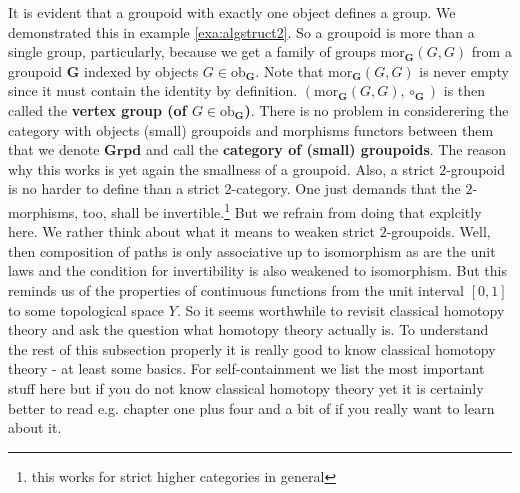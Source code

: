 It is evident that a groupoid with exactly one object defines a group. We demonstrated this in example \ref{exa:algstruct2}. So a groupoid is more than a single group, particularly, because we get a family of groups $\mathrm{mor}_{\mathbf{G}}(G,G)$ from a groupoid $\mathbf{G}$ indexed by objects $G \in \mathrm{ob}_{\mathbf{G}}$. Note that $\mathrm{mor}_{\mathbf{G}}(G,G)$ is never empty since it must contain the identity by definition. $(\mathrm{mor}_{\mathbf{G}}(G,G),\circ_{\mathbf{G}})$ is then called the \textbf{vertex group (of $G \in \mathrm{ob}_{\mathbf{G}}$)}. There is no problem in considerering the category with objects (small) groupoids and morphisms functors between them that we denote $\mathbf{Grpd}$ and call the \textbf{category of (small) groupoids}. The reason why this works is yet again the smallness of a groupoid. Also, a strict $2$-groupoid is no harder to define than a strict $2$-category. One just demands that the $2$-morphisms, too, shall be invertible.\footnote{this works for strict higher categories in general} But we refrain from doing that explcitly here. We rather think about what it means to weaken strict $2$-groupoids. Well, then composition of paths is only associative up to isomorphism as are the unit laws and the condition for invertibility is also weakened to isomorphism. But this reminds us of the properties of continuous functions from the unit interval $[0,1]$ to some topological space $Y$. So it seems worthwhile to revisit classical homotopy theory and ask the question what homotopy theory actually is. To understand the rest of this subsection properly it is really good to know classical homotopy theory - at least some basics. For self-containment we list the most important stuff here but if you do not know classical homotopy theory yet it is certainly better to read e.g. \cite{8b5861fc} chapter one plus four and a bit of \cite{78202e13} if you really want to learn about it.
